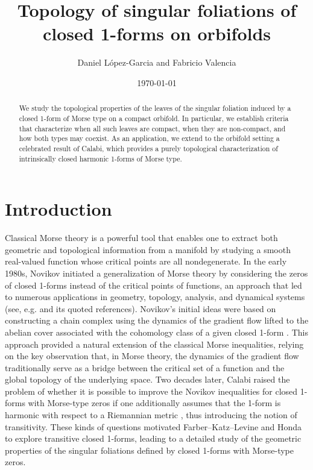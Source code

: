 \documentclass[
  a4paper, 
  reqno, 
  oneside, 
  12pt
]{amsart}
\author{Daniel L\'opez-Garcia {\tiny and} Fabricio Valencia}
\date{\today}
\title{Topology of singular foliations of closed 1-forms on orbifolds}
\theoremstyle{definition}
\theoremstyle{remark}
\begin{document}
\maketitle


\begin{abstract}
We study the topological properties of the leaves of the singular foliation induced by a closed 1-form of Morse type on a compact orbifold. In particular, we establish criteria that characterize when all such leaves are compact, when they are non-compact, and how both types may coexist. As an application, we extend to the orbifold setting a celebrated result of Calabi, which provides a purely topological characterization of intrinsically closed harmonic 1-forms of Morse type.
\end{abstract}

\tableofcontents
\section{Introduction}

Classical Morse theory is a powerful tool that enables one to extract both geometric and topological information from a manifold by studying a smooth real-valued function whose critical points are all nondegenerate. In the early 1980s, Novikov initiated a generalization of Morse theory by considering the zeros of closed 1-forms instead of the critical points of functions, an approach that led to numerous applications in geometry, topology, analysis, and dynamical systems (see, e.g. \cite{F} and its quoted references). Novikov's initial ideas were based on constructing a chain complex using the dynamics of the gradient flow lifted to the abelian cover associated with the cohomology class of a given closed 1-form \cite{No1, No2}. This approach provided a natural extension of the classical Morse inequalities, relying on the key observation that, in Morse theory, the dynamics of the gradient flow traditionally serve as a bridge between the critical set of a function and the global topology of the underlying space. Two decades later, Calabi raised the problem of whether it is possible to improve the Novikov inequalities for closed 1-forms with Morse-type zeros if one additionally assumes that the 1-form is harmonic with respect to a Riemannian metric \cite{Calabi}, thus introducing the notion of transitivity. These kinds of questions motivated Farber--Katz--Levine \cite{FKL} and Honda \cite{Honda} to explore transitive closed 1-forms, leading to a detailed study of the geometric properties of the singular foliations defined by closed 1-forms with Morse-type zeros.
\end{document}
